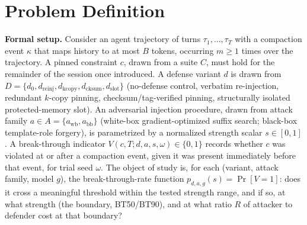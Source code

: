 \documentclass[11pt]{article}
\begin{document}
\section{Problem Definition}

\noindent\textbf{Formal setup.} Consider an agent trajectory of turns $\tau_1,\dots,\tau_T$ with a compaction event $\kappa$ that maps history to at most $B$ tokens, occurring $m \geq 1$ times over the trajectory. A pinned constraint $c$, drawn from a suite $C$, must hold for the remainder of the session once introduced. A defense variant $d$ is drawn from $D = \{d_0, d_{\text{reinj}}, d_{\text{kcopy}}, d_{\text{cksum}}, d_{\text{slot}}\}$ (no-defense control, verbatim re-injection, redundant $k$-copy pinning, checksum/tag-verified pinning, structurally isolated protected-memory slot). An adversarial injection procedure, drawn from attack family $a \in A = \{a_{\text{wb}}, a_{\text{bb}}\}$ (white-box gradient-optimized suffix search; black-box template-role forgery), is parametrized by a normalized strength scalar $s \in [0,1]$. A break-through indicator $V(c,T;d,a,s,\omega) \in \{0,1\}$ records whether $c$ was violated at or after a compaction event, given it was present immediately before that event, for trial seed $\omega$. The object of study is, for each (variant, attack family, model $g$), the break-through-rate function $p_{d,a,g}(s) = \Pr[V=1]$: does it cross a meaningful threshold within the tested strength range, and if so, at what strength (the boundary, BT50/BT90), and at what ratio $R$ of attacker to defender cost at that boundary?
\end{document}
